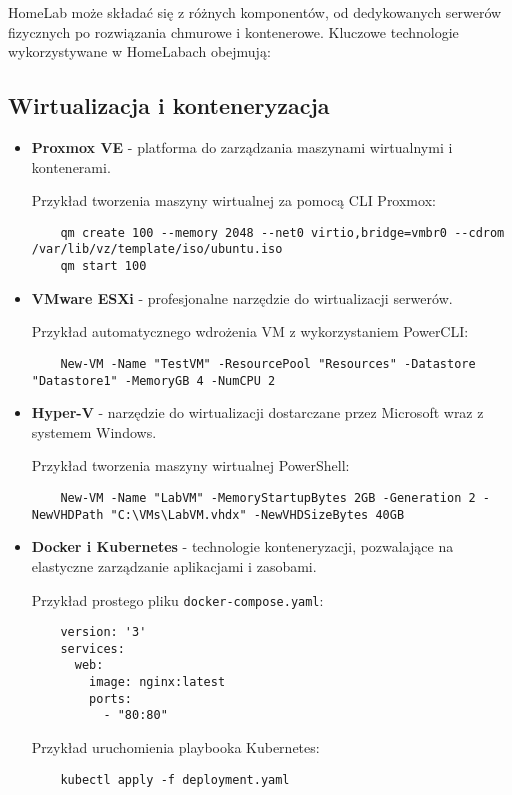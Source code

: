 HomeLab może składać się z różnych komponentów, od dedykowanych serwerów fizycznych po rozwiązania chmurowe i kontenerowe. Kluczowe technologie wykorzystywane w HomeLabach obejmują:

\subsection{Wirtualizacja i konteneryzacja}
\begin{itemize}
    \item \textbf{Proxmox VE} - platforma do zarządzania maszynami wirtualnymi i kontenerami.
    
    Przykład tworzenia maszyny wirtualnej za pomocą CLI Proxmox:
    \begin{lstlisting}
    qm create 100 --memory 2048 --net0 virtio,bridge=vmbr0 --cdrom /var/lib/vz/template/iso/ubuntu.iso
    qm start 100
    \end{lstlisting}

    \item \textbf{VMware ESXi} - profesjonalne narzędzie do wirtualizacji serwerów.
    
    Przykład automatycznego wdrożenia VM z wykorzystaniem PowerCLI:
    \begin{lstlisting}
    New-VM -Name "TestVM" -ResourcePool "Resources" -Datastore "Datastore1" -MemoryGB 4 -NumCPU 2
    \end{lstlisting}

    \item \textbf{Hyper-V} - narzędzie do wirtualizacji dostarczane przez Microsoft wraz z systemem Windows.
    
    Przykład tworzenia maszyny wirtualnej PowerShell:
    \begin{lstlisting}
    New-VM -Name "LabVM" -MemoryStartupBytes 2GB -Generation 2 -NewVHDPath "C:\VMs\LabVM.vhdx" -NewVHDSizeBytes 40GB
    \end{lstlisting}

    \item \textbf{Docker i Kubernetes} - technologie konteneryzacji, pozwalające na elastyczne zarządzanie aplikacjami i zasobami.
    
    Przykład prostego pliku \texttt{docker-compose.yaml}:
    \begin{lstlisting}
    version: '3'
    services:
      web:
        image: nginx:latest
        ports:
          - "80:80"
    \end{lstlisting}
    
    Przykład uruchomienia playbooka Kubernetes:
    \begin{lstlisting}
    kubectl apply -f deployment.yaml
    \end{lstlisting}
\end{itemize}

